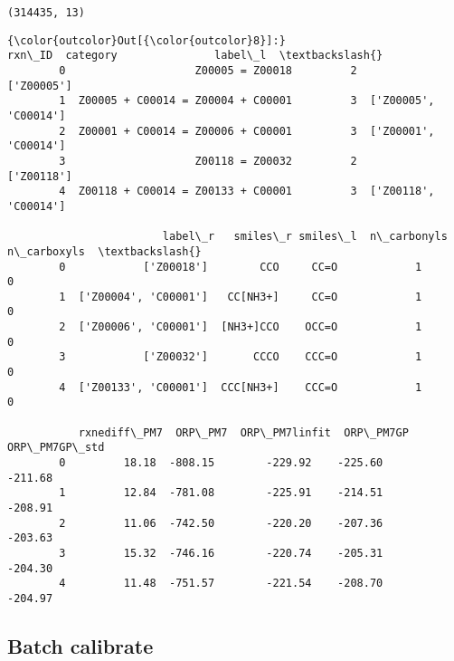 \documentclass[11pt]{article}
\begin{document}
    \begin{Verbatim}[commandchars=\\\{\}]
(314435, 13)

    \end{Verbatim}

\begin{Verbatim}[commandchars=\\\{\}]
{\color{outcolor}Out[{\color{outcolor}8}]:}                               rxn\_ID  category               label\_l  \textbackslash{}
        0                    Z00005 = Z00018         2            ['Z00005']   
        1  Z00005 + C00014 = Z00004 + C00001         3  ['Z00005', 'C00014']   
        2  Z00001 + C00014 = Z00006 + C00001         3  ['Z00001', 'C00014']   
        3                    Z00118 = Z00032         2            ['Z00118']   
        4  Z00118 + C00014 = Z00133 + C00001         3  ['Z00118', 'C00014']   
        
                        label\_r   smiles\_r smiles\_l  n\_carbonyls  n\_carboxyls  \textbackslash{}
        0            ['Z00018']        CCO     CC=O            1            0   
        1  ['Z00004', 'C00001']   CC[NH3+]     CC=O            1            0   
        2  ['Z00006', 'C00001']  [NH3+]CCO    OCC=O            1            0   
        3            ['Z00032']       CCCO    CCC=O            1            0   
        4  ['Z00133', 'C00001']  CCC[NH3+]    CCC=O            1            0   
        
           rxnediff\_PM7  ORP\_PM7  ORP\_PM7linfit  ORP\_PM7GP  ORP\_PM7GP\_std  
        0         18.18  -808.15        -229.92    -225.60        -211.68  
        1         12.84  -781.08        -225.91    -214.51        -208.91  
        2         11.06  -742.50        -220.20    -207.36        -203.63  
        3         15.32  -746.16        -220.74    -205.31        -204.30  
        4         11.48  -751.57        -221.54    -208.70        -204.97  
\end{Verbatim}
            
    \subsection{Batch calibrate}\label{batch-calibrate}
\end{document}

